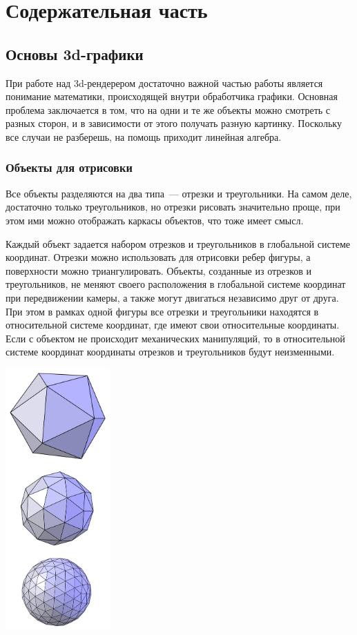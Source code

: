 \documentclass{article}
\begin{document}
\newpage

\section{Содержательная часть}

\subsection{Основы 3d-графики}

При работе над 3d-рендерером достаточно важной частью работы является понимание математики, происходящей внутри обработчика графики. Основная проблема заключается в том, что на одни и те же объекты можно смотреть с разных сторон, и в зависимости от этого получать разную картинку. Поскольку все случаи не разберешь, на помощь приходит линейная алгебра.

\subsubsection{Объекты для отрисовки}

Все объекты разделяются на два типа~--- отрезки и треугольники. На самом деле, достаточно только треугольников, но отрезки рисовать значительно проще, при этом ими можно отображать каркасы объектов, что тоже имеет смысл.

Каждый объект задается набором отрезков и треугольников в глобальной системе координат. Отрезки можно использовать для отрисовки ребер фигуры, а поверхности можно триангулировать. Объекты, созданные из отрезков и треугольников, не меняют своего расположения в глобальной системе координат при передвижении камеры, а также могут двигаться независимо друг от друга. При этом в рамках одной фигуры все отрезки и треугольники находятся в относительной системе координат, где имеют свои относительные координаты. Если с объектом не происходит механических манипуляций, то в относительной системе координат координаты отрезков и треугольников будут неизменными.

\begin{center}
\includegraphics[width=4cm]{surfaces.png}
\end{center}
\end{document}
